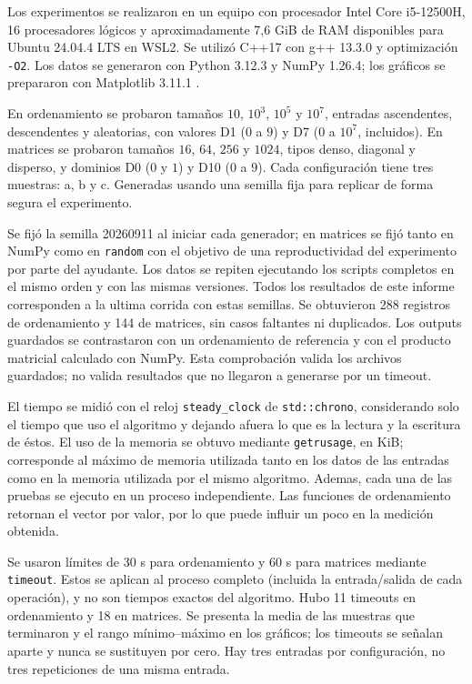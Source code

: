 Los experimentos se realizaron en un equipo con procesador Intel Core i5-12500H,
16 procesadores lógicos y aproximadamente 7,6 GiB de RAM disponibles para Ubuntu
24.04.4 LTS en WSL2. Se utilizó C++17 con g++ 13.3.0 y optimización
\texttt{-O2}. Los datos se generaron con Python 3.12.3 y NumPy 1.26.4;
los gráficos se prepararon con Matplotlib 3.11.1 \cite{matplotlib}.

En ordenamiento se probaron tamaños $10$, $10^3$, $10^5$ y $10^7$, entradas
ascendentes, descendentes y aleatorias, con valores D1 ($0$ a $9$) y D7
($0$ a $10^7$, incluidos). En matrices se probaron tamaños $16$, $64$, $256$
y $1024$, tipos denso, diagonal y disperso, y dominios D0 ($0$ y $1$)
y D10 ($0$ a $9$). Cada configuración tiene tres muestras: a, b y c.
Generadas usando una semilla fija para replicar de forma segura el experimento.

Se fijó la semilla 20260911 al iniciar cada generador; en matrices se fijó
tanto en NumPy como en \texttt{random} con el objetivo de una reproductividad 
del experimento por parte del ayudante. Los datos se repiten ejecutando los
scripts completos en el mismo orden y con las mismas versiones. Todos los
resultados de este informe corresponden a la ultima corrida con estas semillas.
Se obtuvieron 288 registros de ordenamiento y 144 de matrices, sin casos
faltantes ni duplicados. Los outputs guardados se contrastaron con un
ordenamiento de referencia y con el producto matricial calculado con NumPy.
Esta comprobación valida los archivos guardados; no valida resultados que
no llegaron a generarse por un timeout.

El tiempo se midió con el reloj \texttt{steady\_clock} de \texttt{std::chrono}, 
considerando solo el tiempo que uso el algoritmo y dejando afuera lo que es la lectura y 
la escritura de éstos. El uso de la memoria se obtuvo mediante \texttt{getrusage}, en KiB;
corresponde al máximo de memoria utilizada tanto en los datos de las entradas como en la 
memoria utilizada por el mismo algoritmo. Ademas, cada una de las pruebas se ejecuto en 
un proceso independiente. Las funciones de ordenamiento retornan el vector por valor, por 
lo que puede influir un poco en la medición obtenida.

Se usaron límites de 30 s para ordenamiento y 60 s para matrices mediante
\texttt{timeout}. Estos se aplican al proceso completo (incluida la
entrada/salida de cada operación), y no son tiempos exactos del algoritmo. Hubo 11 timeouts en
ordenamiento y 18 en matrices. Se presenta la media de las muestras que
terminaron y el rango mínimo--máximo en los gráficos; los timeouts se señalan
aparte y nunca se sustituyen por cero. Hay tres entradas por configuración,
no tres repeticiones de una misma entrada.
